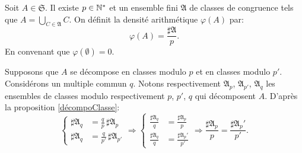 \begin{defi}\label{Def:DensitClassCongr}
 Soit $A \in \mathfrak{S}$. Il existe $p \in \mathbb{N}^*$ et un ensemble fini $\mathfrak{A}$ de classes de congruence tels que $A = \bigcup_{C \in \mathfrak{A}}C$. On définit la densité arithmétique $\varphi(A)$ par:
 \begin{displaymath}
  \varphi(A) = \frac{\sharp \mathfrak{A}}{p}.
 \end{displaymath}
 En convenant que $\varphi(\emptyset) = 0$.
\end{defi}
\begin{demo}
Supposons que $A$ se décompose en classes modulo $p$ et en classes modulo $p'$. Considérons un multiple commun $q$. Notons respectivement $\mathfrak{A}_p$, $\mathfrak{A}_{p'}$, $\mathfrak{A}_q$ les ensembles de classes modulo respectivement $p$, $p'$, $q$ qui décomposent $A$. D'après la proposition \ref{décompoClasse}:
\begin{displaymath}
\left\lbrace
  \begin{aligned}
     \sharp \mathfrak{A}_q &= \frac{q}{p}  \, \sharp \mathfrak{A}_p \\
     \sharp \mathfrak{A}_q &= \frac{q}{p'} \, \sharp \mathfrak{A}_{p'}
  \end{aligned}
\right. \Rightarrow
\left\lbrace
 \begin{aligned}
    \frac{\sharp \mathfrak{A}_q}{q} &= \frac{\sharp \mathfrak{A}_p}{p} \\
    \frac{\sharp \mathfrak{A}_q}{q} &= \frac{\sharp \mathfrak{A}_p'}{p'}
 \end{aligned}
\right . \Rightarrow \frac{\sharp \mathfrak{A}_p}{p} = \frac{\sharp \mathfrak{A}_p'}{p'}.
\end{displaymath}
\end{demo}

